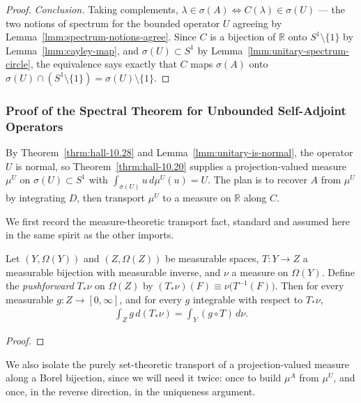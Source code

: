 \begin{proof}
\textit{Conclusion.} Taking complements, $\lambda \in \sigma(A) \iff C(\lambda) \in \sigma(U)$ — the two notions of spectrum for the bounded operator $U$ agreeing by Lemma~\ref{lmm:spectrum-notions-agree}. Since $C$ is a bijection of $\mathbb{R}$ onto $S^1\setminus\{1\}$ by Lemma~\ref{lmm:cayley-map}, and $\sigma(U) \subset S^1$ by Lemma~\ref{lmm:unitary-spectrum-circle}, the equivalence says exactly that $C$ maps $\sigma(A)$ onto $\sigma(U) \cap (S^1\setminus\{1\}) = \sigma(U)\setminus\{1\}$.
\end{proof}

\subsubsection{Proof of the Spectral Theorem for Unbounded Self-Adjoint Operators}
By Theorem~\ref{thrm:hall-10.28} and Lemma~\ref{lmm:unitary-is-normal}, the operator $U$ is normal, so Theorem~\ref{thrm:hall-10.20} supplies a projection-valued measure $\mu^U$ on $\sigma(U) \subset S^1$ with $\int_{\sigma(U)} u \, d\mu^U(u) = U$. The plan is to recover $A$ from $\mu^U$ by integrating $D$, then transport $\mu^U$ to a measure on $\mathbb{R}$ along $C$.

We first record the measure-theoretic transport fact, standard and assumed here in the same spirit as the other imports.

\begin{theorem}
    \label{thrm:change-of-variables}
    \leanok
    Let $(Y,\Omega(Y))$ and $(Z,\Omega(Z))$ be measurable spaces, $T : Y \to Z$ a measurable bijection with measurable inverse, and $\nu$ a measure on $\Omega(Y)$. Define the \textit{pushforward} $T_*\nu$ on $\Omega(Z)$ by $(T_*\nu)(F) \equiv \nu\big(T^{-1}(F)\big)$. Then for every measurable $g : Z \to [0,\infty]$, and for every $g$ integrable with respect to $T_*\nu$,
    \begin{align}
        \int_Z g \, d(T_*\nu) = \int_Y (g \circ T) \, d\nu.
    \end{align}
\end{theorem}
\begin{proof}
\leanok
\end{proof}

We also isolate the purely set-theoretic transport of a projection-valued measure along a Borel bijection, since we will need it twice: once to build $\mu^A$ from $\mu^U$, and once, in the reverse direction, in the uniqueness argument.

